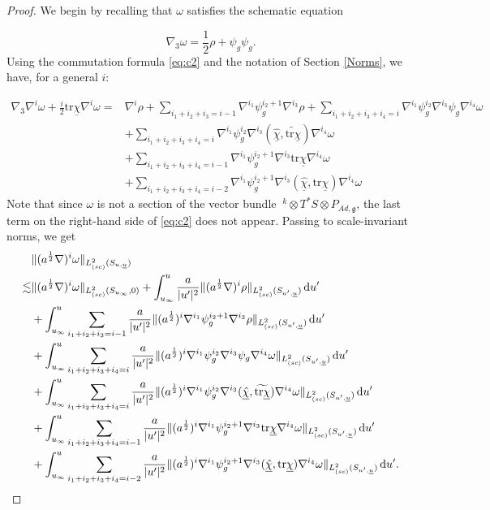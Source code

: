 \documentclass{amsart}
\newcommand{\aln}{(\al \nabla)^i}
\newcommand{\intu}{\int_{u_{\infty}}^u}
\newcommand{\upr}{\lvert u^\prime \rvert}
\newcommand{\al}{a^{\frac{1}{2}}}
\newcommand{\chibar}{\underline{\chi}}
\newcommand{\chibarhat}{\underline{\hat{\chi}}}
\newcommand{\ubar}{\underline{u}}
\newcommand{\tildetr}{\widetilde{\tr \chibar}}
\newcommand{\scaletwoSu}[1]{\lVert{#1} \rVert_{L^2_{(sc)}(S_{u,\ubar})}}
\newcommand{\scaletwoSuprime}[1]{\lVert{#1} \rVert_{L^2_{(sc)}(S_{u^\prime,\ubar})}}
\newcommand{\duprime}{\hspace{.5mm} \text{d}u^{\prime}}
\newcommand{\tr}{\mbox{tr}}
\begin{document}
{\begin{proof}
We begin by recalling that $\omega$ satisfies the schematic equation

\[\nabla_3 \omega =\frac{1}{2}\rho+ \psi_g \psi_g. \] Using the commutation formula \ref{eq:c2} and the notation of Section \ref{Norms}, we have, for a general $i$:


\begin{equation}
    \begin{split}
        \nabla_3\nabla^i\omega + \frac{i}2\tr\chibar \nabla^i \omega = &\nabla^i\rho + \sum_{i_1+i_2+i_3=i-1}\nabla^{i_1}\psi_g^{i_2+1}\nabla^{i_3}\rho+ \sum_{i_1+i_2+i_3+i_4=i} \nabla^{i_1}\psi_g^{i_2}\nabla^{i_3}\psi_g \nabla^{i_4}\omega  \\ & + \sum_{i_1+i_2+i_3+i_4=i} \nabla^{i_1}\psi_g^{i_2}\nabla^{i_3}(\chibarhat,\tildetr)\nabla^{i_4}\omega\\&+ \sum_{i_1+i_2+i_3+i_4=i-1}\nabla^{i_1}\psi_g^{i_2+1}\nabla^{i_3}\tr\chibar \nabla^{i_4}\omega \\&+ \sum_{i_1+i_2+i_3+i_4=i-2}\nabla^{i_1}\psi_g^{i_2+1}\nabla^{i_3}(\chibarhat,\tr\chibar)\nabla^{i_4}\omega
    \end{split}
\end{equation}Note that since $\omega$ is not a section of the vector bundle $~^{k}\otimes T^{*}S\otimes P_{Ad,\mathfrak{g}}$, the last term on the right-hand side of \ref{eq:c2} does not appear. Passing to scale-invariant norms, we get 
\begin{align}
     \nonumber     &\scaletwoSu{\aln \omega}\\  \nonumber \lesssim &\lVert (\al\nabla)^i\omega \rVert_{L^2_{(sc)}(S_{u_\infty},0)} + \intu \frac{a}{\upr^2}\scaletwoSuprime{\aln \rho}\duprime\\  \nonumber &+ \intu \sum_{i_1+i_2+i_3=i-1} \frac{a}{\upr^2}\scaletwoSuprime{(\al)^i \nabla^{i_1}\psi_g^{i_2+1}\nabla^{i_3}\rho}\duprime \\  \nonumber &+ \intu \sum_{i_1+i_2+i_3+i_4=i} \frac{a}{\upr^2}\scaletwoSuprime{(\al)^i \nabla^{i_1}\psi_g^{i_2}\nabla^{i_3} \psi_g \nabla^{i_4}\omega} \duprime  \\  \nonumber &+\intu \sum_{i_1+i_2+i_3+i_4=i} \frac{a}{\upr^2}\scaletwoSuprime{(\al)^i \nabla^{i_1}\psi_g^{i_2}\nabla^{i_3}(\chibarhat, \tildetr) \nabla^{i_4}\omega} \duprime \\  \nonumber &+\intu \sum_{i_1+i_2+i_3+i_4=i-1} \frac{a}{\upr^2}\scaletwoSuprime{(\al)^i \nabla^{i_1}\psi_g^{i_2+1}\nabla^{i_3}\tr\chibar \nabla^{i_4}\omega} \duprime \\  \nonumber &+\intu \sum_{i_1+i_2+i_3+i_4=i-2} \frac{a}{\upr^2}\scaletwoSuprime{(\al)^i \nabla^{i_1}\psi_g^{i_2+1}\nabla^{i_3}(\chibarhat, \tr\chibar) \nabla^{i_4}\omega} \duprime. 

\end{align}
\end{proof}}
\end{document}
